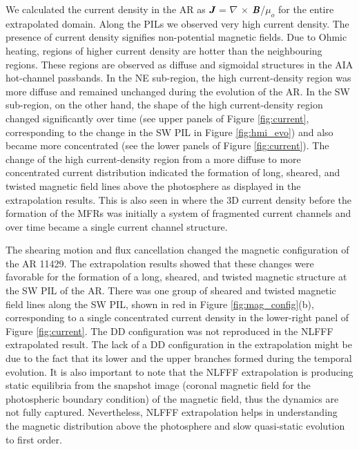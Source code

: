 \documentclass{aastex62}
\begin{document}
We calculated the current density in the AR as $\textit{\textbf{J}}$ = $\nabla$  $\times$  $\textit{\textbf{B}}$/$\mu_o$ for the entire extrapolated domain. Along the PILs we observed very high current density. The presence of current density signifies non-potential magnetic fields. Due to Ohmic heating, regions of higher current density are hotter than the neighbouring regions. These regions are observed as diffuse and sigmoidal structures in the AIA hot-channel passbands. In the NE sub-region, the high current-density region was more diffuse and remained unchanged during the evolution of the AR. In the SW sub-region, on the other hand, the shape of the high current-density region changed significantly over time (see upper panels of Figure \ref{fig:current}, corresponding to the change in the SW PIL in Figure \ref{fig:hmi_evo}) and also became more concentrated (see the lower panels of Figure \ref{fig:current}). The change of the high current-density region from a more diffuse to more concentrated current distribution indicated the formation of long, sheared, and twisted magnetic field lines above the photosphere as displayed in the extrapolation results. This is also seen in \citet{Chintzoglou_etal_2015} where the 3D current density before the formation of the MFRs was initially a system of fragmented current channels and over time became a single current channel structure. 

The shearing motion and flux cancellation changed the magnetic configuration of the AR 11429. The extrapolation results showed that these changes were favorable for the formation of a long, sheared, and twisted magnetic structure at the SW PIL of the AR. There was one group of sheared and twisted magnetic field lines along the SW PIL, shown in red in Figure \ref{fig:mag_config}(b), corresponding to a single concentrated current density in the lower-right panel of Figure \ref{fig:current}. The DD configuration was not reproduced in the NLFFF extrapolated result. The lack of a DD configuration in the extrapolation might be due to the fact that its lower and the upper branches formed during the temporal evolution. It is also important to note that the NLFFF extrapolation is producing static equilibria from the snapshot image (coronal magnetic field for the photospheric boundary condition) of the magnetic field, thus the dynamics are not fully captured. Nevertheless, NLFFF extrapolation helps in understanding the magnetic distribution above the photosphere and slow quasi-static evolution to first order.
\end{document}
